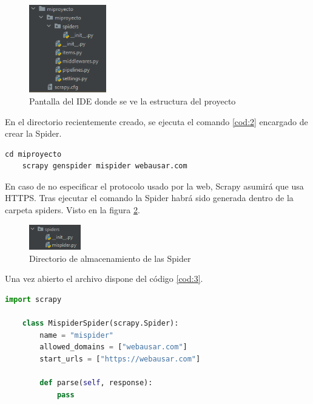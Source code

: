 \begin{figure} [h!]
	\centering
	\includegraphics[width=0.3\textwidth]{fig/estructura_proyecto_scrapy.png}
	\caption[Pantalla del IDE donde se ve la estructura del proyecto]{Pantalla del IDE donde se ve la estructura del proyecto}
	\label{fig:ej11}
\end{figure}

En el directorio recientemente creado, se ejecuta el comando \ref{cod:2} encargado de crear la Spider.

\begin{lstlisting}[caption={Instrucciones de consola en Linux para la creación de una Spider scrapy}, label=cod:2]
	cd miproyecto
	scrapy genspider mispider webausar.com
\end{lstlisting}

En caso de no especificar el protocolo usado por la web, Scrapy asumirá que usa HTTPS. Tras ejecutar el comando la Spider habrá sido generada dentro de la carpeta spiders. Visto en la figura \ref{fig:ej12}.

\begin{figure} [h!]
	\centering
	\includegraphics[width=0.2\textwidth]{fig/primera_spider.png}
	\caption[Directorio de almacenamiento de las Spider]{Directorio de almacenamiento de las Spider}
	\label{fig:ej12}
\end{figure}

Una vez abierto el archivo dispone del código \ref{cod:3}.

\begin{lstlisting}[language=Python, caption={Spider recién generada}, label=cod:3]
	import scrapy
	
	class MispiderSpider(scrapy.Spider):
		name = "mispider"
		allowed_domains = ["webausar.com"]
		start_urls = ["https://webausar.com"]
	
		def parse(self, response):
			pass
\end{lstlisting}

